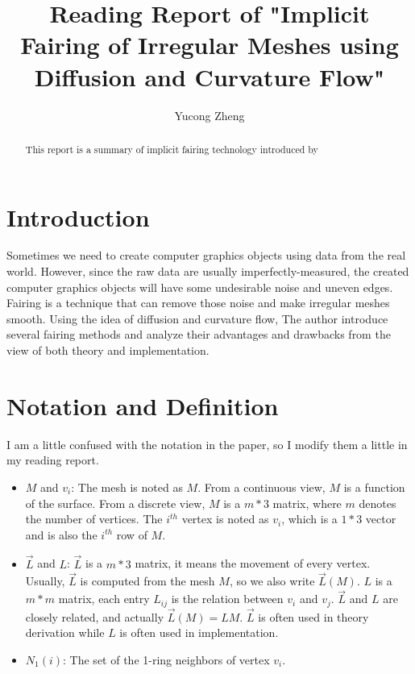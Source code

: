 \documentclass[tog]{acmsiggraph}
\title{Reading Report of "Implicit Fairing of Irregular Meshes using Diffusion and Curvature Flow"}
\author{Yucong Zheng}
\begin{document}
\maketitle

\begin{abstract}

This report is a summary of implicit fairing technology introduced by ~\cite{implicit-fairing}

\end{abstract}

\keywordlist



\section{Introduction}

Sometimes we need to create computer graphics objects using data from the real world. However, since the raw data are usually imperfectly-measured, the created computer graphics objects will have some undesirable noise and uneven edges. Fairing is a technique that can remove those noise and make irregular meshes smooth. Using the idea of diffusion and curvature flow, The author introduce several fairing methods and analyze their advantages and drawbacks from the view of both theory and implementation.


\section{Notation and Definition}

I am a little confused with the notation in the paper, so I modify them a little in my reading report.

\begin{itemize}
	\item $M$ and $v_i$: The mesh is noted as $M$. From a continuous view, $M$ is a function of the surface. From a discrete view, $M$ is a $m*3$ matrix, where $m$ denotes the number of vertices. The $i^{th}$ vertex is noted as $v_i$, which is a $1*3$ vector and is also the $i^{th}$ row of $M$.
	\item $\vec{L}$ and $L$: $\vec{L}$ is a $m*3$ matrix, it means the movement of every vertex. Usually, $\vec{L}$ is computed from the mesh $M$, so we also write $\vec{L}(M)$. $L$ is a $m*m$ matrix, each entry $L_{ij}$ is the relation between $v_i$ and $v_j$. $\vec{L}$ and $L$ are closely related, and actually $\vec{L}(M) = LM$. $\vec{L}$ is often used in theory derivation while $L$ is often used in implementation.
	\item $N_1(i)$: The set of the 1-ring neighbors of vertex $v_i$.
\end{itemize}
\end{document}
